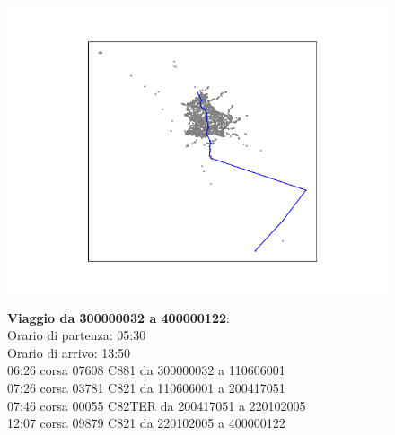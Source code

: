 \documentclass{article}
\begin{document}
\begin{figure}[H]
	\begin{minipage}{0.55\linewidth}
		\centering
		\hspace*{-3cm}\includegraphics[width=1.0\linewidth, valign=t]{figures/300000032_400000122}
	\end{minipage}
	\hspace*{-2cm}\begin{minipage}{0.7\linewidth}
		\textbf{Viaggio da 300000032 a 400000122}:\\
		Orario di partenza: 05:30\\
		Orario di arrivo: 13:50\\
		06:26 corsa 07608 C881 da 300000032 a 110606001\\
		07:26 corsa 03781 C821 da 110606001 a 200417051\\
		07:46 corsa 00055 C82TER da 200417051 a 220102005\\
		12:07 corsa 09879 C821 da 220102005 a 400000122
		
			\end{minipage}
\end{figure}
\end{document}
